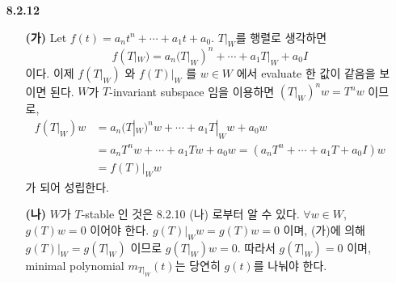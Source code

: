 \documentclass[12pt]{report}
\begin{document}
\begin{itemize}
\item[\textbf{8.2.12}] 
	\begin{itemize}
		\item[\textbf{(가)}] Let $f(t)=a_nt^n+\cdots+a_1t+a_0$. $T|_W$를 행렬로 생각하면 $$f(T|_W)=a_n(T|_W)^n+\cdots + a_1T|_W+a_0I$$ 이다. 이제 $f(T|_W)$ 와 $f(T)|_W$ 를 $w\in W$ 에서 evaluate 한 값이 같음을 보이면 된다. $W$가 $T$-invariant subspace 임을 이용하면 $(T|_W)^nw = T^nw$ 이므로,$$\begin{aligned} f(T|_W)w &= a_n(T|_W)^nw+\cdots + a_1T|_Ww+a_0w \\&= a_nT^nw + \cdots + a_1Tw + a_0w = (a_nT^n + \cdots + a_1T + a_0I)w \\ &=f(T)|_Ww\end{aligned}$$ 가 되어 성립한다.
		\item[\textbf{(나)}] $W$가 $T$-stable 인 것은 8.2.10 (나) 로부터 알 수 있다. $\forall w\in W$, $g(T)w=0$ 이어야 한다. $g(T)|_Ww = g(T)w = 0$ 이며, (가)에 의해 $g(T)|_W = g(T|_W)$ 이므로 $g(T|_W)w=0$. 따라서 $g(T|_W) = 0$ 이며, minimal polynomial $m_{T|_W}(t)$는 당연히 $g(t)$를 나눠야 한다.
	\end{itemize}
	

\end{itemize}
\end{document}
